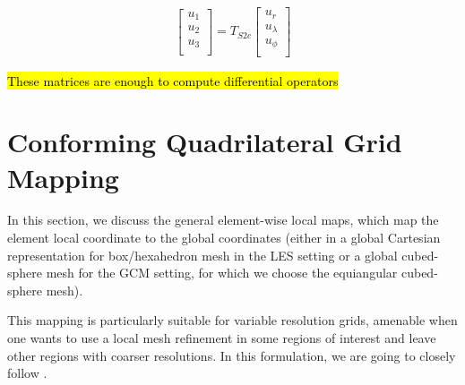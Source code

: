\documentclass{report}
\begin{document}
\begin{enumerate}
\begin{itemize}
\begin{align*}
\begin{bmatrix}
            u_1 \\
            u_2\\
            u_3\\
        \end{bmatrix}
        = T_{S2c} 
        \begin{bmatrix}
            u_{r} \\
            u_{\lambda}\\
            u_{\phi}\\
        \end{bmatrix}
    \end{align*}
    \end{itemize}
    \hl{These matrices are enough to compute differential operators}
\end{enumerate}



\section[Conforming quadrilateral grid mapping]{Conforming Quadrilateral Grid Mapping}

In this section, we discuss the general element-wise local maps, which map the element local coordinate to the global coordinates (either in a global Cartesian representation for box/hexahedron mesh in the LES setting or a global cubed-sphere mesh for the GCM setting, for which we choose the equiangular cubed-sphere mesh).

This mapping is particularly suitable for variable resolution grids, amenable when one wants to use a local mesh refinement in some regions of interest and leave other regions with coarser resolutions. In this formulation, we are going to closely follow \citep{Guba14a}.
\end{document}
